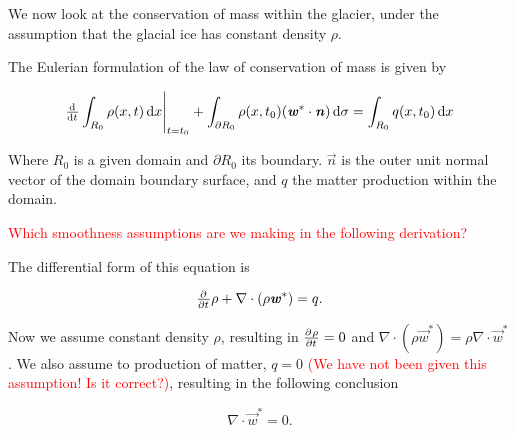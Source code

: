 We now look at the conservation of mass within the glacier, under the assumption that the glacial ice has constant density $\rho$.

The Eulerian formulation of the law of conservation of mass is given by

\begin{equation}
  \eval{\od{}{t} \int_{R_0} \rho(x, t) \dif{x}}_{t = t_0} + \int_{\partial R_0} \rho(x, t_0) (\vec{w}^* \cdot \vec{n}) \dif{\sigma} = \int_{R_0} q(x, t_0) \dif{x}
\end{equation}

Where $R_0$ is a given domain and $\partial R_0$ its boundary. $\vec{n}$ is the outer unit normal vector of the domain boundary surface, and $q$ the matter production within the domain.

\textcolor{red}{Which smoothness assumptions are we making in the following derivation?}

The differential form of this equation is

\begin{equation}
  \pd{}{t} \rho + \nabla \cdot (\rho \vec{w}^*) = q.
\end{equation}

Now we assume constant density $\rho$, resulting in $\pd{\rho}{t} = 0$ and $\nabla \cdot (\rho \vec{w}^*) = \rho \nabla \cdot \vec{w}^*$. We also assume to production of matter, $q = 0$ \textcolor{red}{(We have not been given this assumption! Is it correct?)}, resulting in the following conclusion

\begin{equation} \label{eq:velocity-divergence}
  \nabla \cdot \vec{w}^* = 0.
\end{equation}
